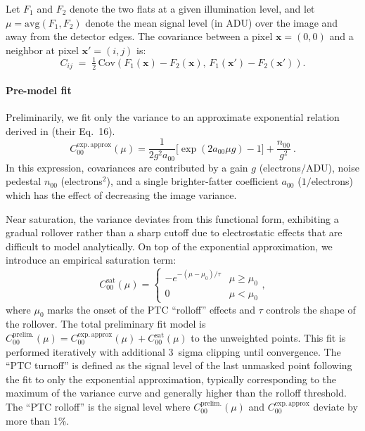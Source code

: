 Let $F_1$ and $F_2$ denote the two flats at a given illumination level, and let $\mu = \mathrm{avg}(F_1,F_2)$ denote the mean signal level (in ADU) over the image and away from the detector edges.
The covariance between a pixel $\mathbf{x}=(0,0)$ and a neighbor at pixel $\mathbf{x}'=(i,j)$ is:
\begin{equation}
    C_{ij} \;=\; \tfrac{1}{2}\,
    \mathrm{Cov}\!\left(F_1(\mathbf{x})-F_2(\mathbf{x}),\,
                       F_1(\mathbf{x}')-F_2(\mathbf{x}')\right).
\end{equation}


\paragraph{Pre-model fit}
Preliminarily, we fit only the variance to an approximate exponential relation derived in \citet{2019A&A...629A..36A} (their Eq.~16).
\begin{equation}
    C_{00}^{\mathrm{exp.\,approx}}(\mu) = \frac{1}{2 g^2 a_{00}}\bigl[\exp(2 a_{00} \mu g) - 1\bigr] + \frac{n_{00}}{g^2}\ .
\end{equation}
In this expression, covariances are contributed by a gain $g$ (electrons$/\mathrm{ADU}$), noise pedestal $n_{00}$ (electrons$^2$), and a single brighter-fatter coefficient $a_{00}$ ($1/$electrons) which has the effect of decreasing the image variance.

Near saturation, the variance deviates from this functional form, exhibiting a gradual rollover rather than a sharp cutoff due to electrostatic effects that are difficult to model analytically.
On top of the exponential approximation, we introduce an empirical saturation term:
\begin{equation}
    C_{00}^{\mathrm{sat}}(\mu) = \left\{
        \begin{array}{ll}
            -e^{-(\mu-\mu_0)/\tau} & \mu \ge \mu_0 \\
            0 & \mu < \mu_0
        \end{array}
    \right.,
\end{equation}
where $\mu_0$ marks the onset of the PTC ``rolloff'' effects and $\tau$ controls the shape of the rollover.
The total preliminary fit model is $C_{00}^{\mathrm{prelim.}}(\mu) = C_{00}^{\mathrm{exp.\,approx}}(\mu) + C_{00}^{\mathrm{sat}}(\mu)$ to the unweighted points. This fit is performed iteratively with additional 3~sigma clipping until convergence.
The ``PTC turnoff'' is defined as the signal level of the last unmasked point following the fit to only the exponential approximation, typically corresponding to the maximum of the variance curve and generally higher than the rolloff threshold.
The ``PTC rolloff'' is the signal level where $C_{00}^{\mathrm{prelim.}}(\mu)$ and $C_{00}^{\mathrm{exp.\,approx}}$ deviate by more than 1\%.

